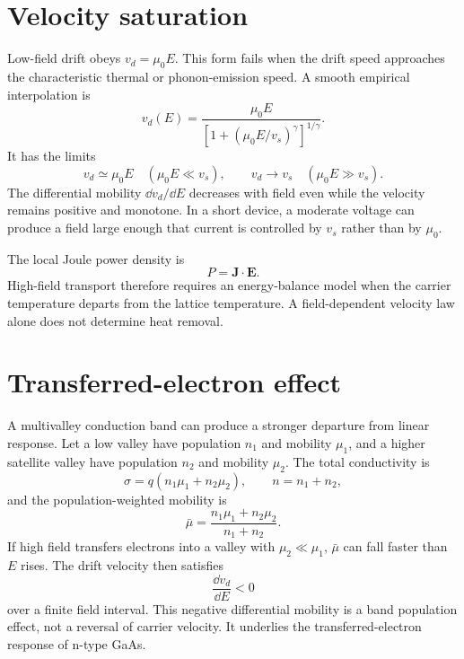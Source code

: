 \section{Velocity saturation}

Low-field drift obeys $v_d=\mu_0E$.  This form fails when the drift speed
approaches the characteristic thermal or phonon-emission speed.  A smooth
empirical interpolation is
\begin{equation}
  \boxed{
  v_d(E)=
  \frac{\mu_0E}
  {\left[1+(\mu_0E/v_s)^\gamma\right]^{1/\gamma}}.
  }
  \label{eq:velocity-saturation-model}
\end{equation}
It has the limits
\begin{equation}
  v_d\simeq\mu_0E\quad(\mu_0E\ll v_s),
  \qquad
  v_d\longrightarrow v_s\quad(\mu_0E\gg v_s).
  \label{eq:velocity-saturation-limits}
\end{equation}
The differential mobility $\dd v_d/\dd E$ decreases with field even while the
velocity remains positive and monotone.  In a short device, a moderate voltage
can produce a field large enough that current is controlled by $v_s$ rather
than by $\mu_0$.

The local Joule power density is
\begin{equation}
  P=\bm J\cdot\bm E.
  \label{eq:high-field-joule-power}
\end{equation}
High-field transport therefore requires an energy-balance model when the
carrier temperature departs from the lattice temperature.  A field-dependent
velocity law alone does not determine heat removal.

\section{Transferred-electron effect}

A multivalley conduction band can produce a stronger departure from linear
response.  Let a low valley have population $n_1$ and mobility $\mu_1$, and a
higher satellite valley have population $n_2$ and mobility $\mu_2$.  The total
conductivity is
\begin{equation}
  \sigma=q(n_1\mu_1+n_2\mu_2),
  \qquad n=n_1+n_2,
  \label{eq:two-valley-conductivity}
\end{equation}
and the population-weighted mobility is
\begin{equation}
  \bar\mu
  =\frac{n_1\mu_1+n_2\mu_2}{n_1+n_2}.
  \label{eq:two-valley-mobility}
\end{equation}
If high field transfers electrons into a valley with $\mu_2\ll\mu_1$,
$\bar\mu$ can fall faster than $E$ rises.  The drift velocity then satisfies
\begin{equation}
  \frac{\dd v_d}{\dd E}<0
  \label{eq:negative-differential-mobility}
\end{equation}
over a finite field interval.  This negative differential mobility is a band
population effect, not a reversal of carrier velocity.  It underlies the
transferred-electron response of n-type GaAs.

